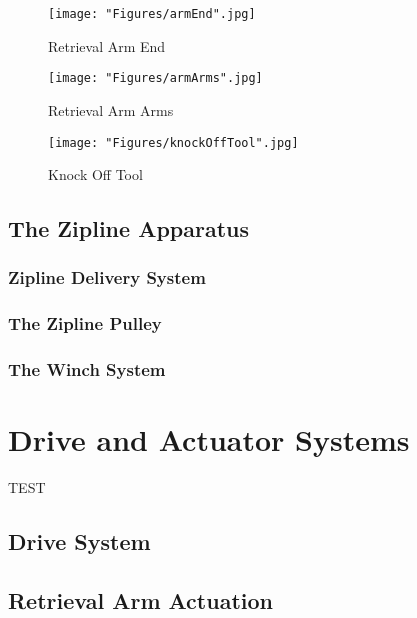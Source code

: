\documentclass[11pt, oneside]{article} %
\begin{document}
	\begin{figure}[h]
		\centering
		\begin{minipage}[t]{.5\textwidth}
			\centering
			\texttt{[image: "Figures/armEnd".jpg]}
			\caption[Retrieval Arm End]{Retrieval Arm End}
			\label{fig:armEnd}
		\end{minipage}%
		\begin{minipage}[t]{.5\textwidth}
			\centering
			\texttt{[image: "Figures/armArms".jpg]}
			\caption[Retrieval Arm Arms]{Retrieval Arm Arms}
			\label{fig:arm}
		\end{minipage}
	\end{figure}
	
	\begin{figure}[!h]
		\centering
		\texttt{[image: "Figures/knockOffTool".jpg]}
		\caption[Knock Off Tool]{Knock Off Tool}
		\label{fig:knockOffTool}
	\end{figure}
	
	\subsection{The Zipline Apparatus}
		\subsubsection{Zipline Delivery System}
	
		\subsubsection{The Zipline Pulley}
	
		\subsubsection{The Winch System}

\section{Drive and Actuator Systems}


TEST
	\subsection{Drive System}
	
	\subsection{Retrieval Arm Actuation}
	
\end{document}
